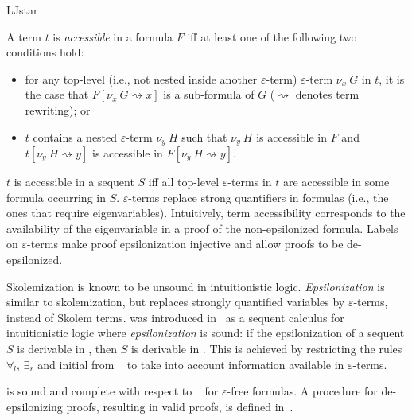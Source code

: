 \begin{entry}{LJstar}
\begin{clarifications}
  A term $t$ is \emph{accessible} in a formula $F$ iff at least one of the
  following two conditions hold: 
  \begin{itemize}
    \item for any top-level (i.e., not nested inside another $\varepsilon$-term)
    $\varepsilon$-term $\nu_x~G$ in $t$, it is the case that $F[\nu_x~G
    \rightsquigarrow x]$ is a sub-formula of $G$ ($\rightsquigarrow$ denotes term
    rewriting); or
  
    \item $t$ contains a nested $\varepsilon$-term $\nu_y~H$ such that $\nu_y~H$
    is accessible in $F$ and $t[\nu_y~H \rightsquigarrow y]$ is accessible in
    $F[\nu_y~H \rightsquigarrow y]$.
  \end{itemize}
  $t$ is accessible in a sequent $S$ iff all top-level
  $\varepsilon$-terms in $t$ are accessible in some formula occurring in $S$.
  $\varepsilon$-terms replace strong quantifiers in formulas (i.e., the ones
  that require eigenvariables).
  Intuitively, term accessibility corresponds to the availability of the
  eigenvariable in a proof of the non-epsilonized formula.
  Labels on $\varepsilon$-terms make proof epsilonization injective and allow
  proofs to be de-epsilonized.
\end{clarifications}

\begin{history}
  Skolemization is known to be unsound in intuitionistic logic.
  \emph{Epsilonization} is similar to skolemization, but replaces strongly
  quantified variables by $\varepsilon$-terms, instead of Skolem terms. \LJstar
  was introduced in~\cite{Reis2016} as a sequent calculus for
  intuitionistic logic where \emph{epsilonization} is sound: if the
  epsilonization of a sequent $S$ is derivable in \LJstar, then $S$ is derivable in \LJ.
  This is achieved by restricting the rules $\forall_l$, $\exists_r$ and initial
  from \LJ~ to take into account information available in
  $\varepsilon$-terms.
\end{history}

\begin{technicalities}
  \LJstar is sound and complete with respect to \LJ~ for
  $\varepsilon$-free formulas. A procedure for de-epsilonizing \LJstar proofs,
  resulting in valid \LJ proofs, is defined in~\cite{Reis2016}.
\end{technicalities}

\end{entry}
